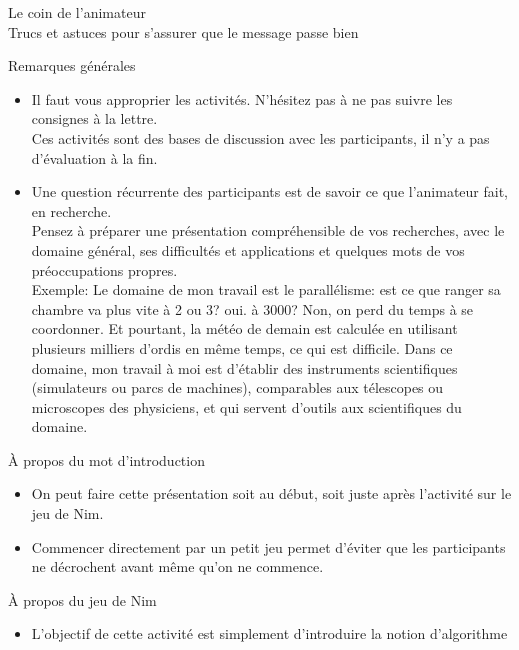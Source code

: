 \begin{frame}{Le coin de l'animateur\\[-5pt]
\label{coin::animateur}
  {\large Trucs et astuces pour s'assurer que le message passe bien}}
  \begin{block}{Remarques générales}
    \begin{itemize}
    \item Il faut vous approprier les activités. N'hésitez pas à ne pas suivre
      les consignes à la lettre.\\
      Ces activités sont des bases de discussion avec les participants, il n'y
      a pas d'évaluation à la fin.
    \item Une question récurrente des participants est de savoir ce que
      l'animateur fait, en recherche.\\
      Pensez à préparer une présentation compréhensible de vos recherches, avec
      le domaine général, ses difficultés et applications et quelques mots de
      vos préoccupations propres.\\
      {\footnotesize Exemple: Le domaine de mon travail est le parallélisme:
        est ce que ranger sa chambre va plus vite à 2 ou 3? oui. à 3000? Non,
        on perd du temps à se coordonner. Et pourtant, la météo de demain est
        calculée en utilisant plusieurs milliers d'ordis en même temps, ce qui
        est difficile. Dans ce domaine, mon travail à moi est d'établir des
        instruments scientifiques (simulateurs ou parcs de machines),
        comparables aux télescopes ou microscopes des physiciens, et qui
        servent d'outils aux scientifiques du domaine.}
    \end{itemize}
  \end{block}
  \begin{block}{À propos du mot d'introduction}
    \begin{itemize}
    \item On peut faire cette présentation soit au début, soit juste après
      l'activité sur le jeu de Nim.
    \item Commencer directement par un petit jeu permet d'éviter que les
      participants ne décrochent avant même qu'on ne commence.
    \end{itemize}
  \end{block}
  \begin{block}{À propos du jeu de Nim}
    \begin{itemize}
    \item L'objectif de cette activité est simplement d'introduire la notion d'algorithme

\end{itemize}
\end{block}
\end{frame}

